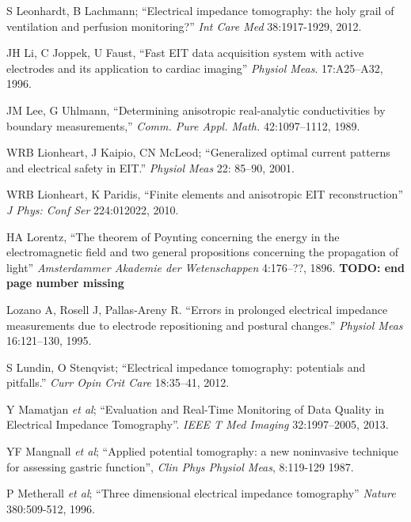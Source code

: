 \documentclass[12pt]{article} \usepackage[margin=3cm]{geometry} \usepackage[margin=20pt,font=small,labelfont=bf]{caption}\def\TBLWIDA{35mm}\def\TBLWIDB{95mm}
\newcommand{\TODO}[1]{{\bf TODO: #1}}
\newcommand{\ifmaxthree}[2]{#2 {\em et al}; }
\begin{document}
\begin{thebibliography}{00}
S Leonhardt, B Lachmann;
``Electrical impedance tomography: the holy grail of
ventilation and perfusion monitoring?''
{\em Int Care Med} 38:1917-1929, 2012.

JH Li, C Joppek, U Faust,
``Fast EIT data acquisition system with active electrodes and its application to cardiac imaging''
{\em  Physiol Meas}. 17:A25--A32, 1996.

JM Lee, G Uhlmann, ``Determining anisotropic real-analytic
 conductivities by boundary measurements,''
{\em Comm. Pure Appl. Math.} 42:1097--1112, 1989.

WRB Lionheart, J Kaipio, CN McLeod;
``Generalized optimal current patterns and electrical safety in EIT.'' 
{\em Physiol Meas} 22: 85--90, 2001.

WRB Lionheart, K Paridis,
``Finite elements and anisotropic EIT reconstruction''
{\em  J Phys: Conf Ser} 224:012022, 2010.

HA Lorentz,
``The theorem of Poynting concerning the energy in the electromagnetic
field and two general propositions concerning the propagation of light''
{\em  Amsterdammer Akademie der Wetenschappen} 4:176--??, 1896.
\TODO{end page number missing}


Lozano A, Rosell J, Pallas-Areny R. 
``Errors in prolonged electrical impedance measurements due to electrode repositioning and postural changes.''
{\em  Physiol Meas} 16:121--130, 1995.

S Lundin, O Stenqvist;
``Electrical impedance tomography: potentials and pitfalls.''
{\em Curr Opin Crit Care} 18:35--41, 2012.


\ifmaxthree{
Y Mamatjan, B Grychtol, P Gaggero, J Justiz, V Koch, A Adler. 
}{
Y Mamatjan
}
``Evaluation and Real-Time Monitoring of Data Quality in Electrical Impedance Tomography''.
{\em IEEE T Med Imaging} 32:1997--2005, 2013.

\ifmaxthree{
YF Mangnall, AJ Baxter, R Avill, NC Bird, BH Brown, DC Barber, AD Seagar, AG Johnson, NW Read
}{
YF Mangnall
}
``Applied potential tomography: a new noninvasive technique for assessing gastric function'',
{\em Clin Phys Physiol Meas}, 8:119-129 1987.

\ifmaxthree{
P Metherall, DC Barber, RH Smallwood, BH Brown.
}{
P Metherall
}
``Three dimensional electrical impedance tomography''
{\em Nature} 380:509-512, 1996.


\end{thebibliography}
\end{document}
